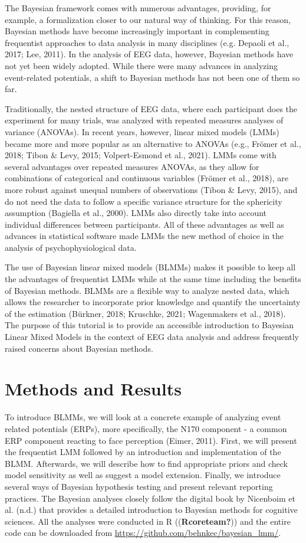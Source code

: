 \documentclass[
  doc,12pt,floatsintext]{apa7}
\begin{document}
The Bayesian framework comes with numerous advantages, providing, for example, a formalization closer to our natural way of thinking. For this reason, Bayesian methods have become increasingly important in complementing frequentist approaches to data analysis in many disciplines (e.g. Depaoli et al., 2017; Lee, 2011). In the analysis of EEG data, however, Bayesian methods have not yet been widely adopted. While there were many advances in analyzing event-related potentials, a shift to Bayesian methods has not been one of them so far.

Traditionally, the nested structure of EEG data, where each participant does the experiment for many trials, was analyzed with repeated measures analyses of variance (ANOVAs). In recent years, however, linear mixed models (LMMs) became more and more popular as an alternative to ANOVAs (e.g., Frömer et al., 2018; Tibon \& Levy, 2015; Volpert-Esmond et al., 2021). LMMs come with several advantages over repeated measures ANOVAs, as they allow for combinations of categorical and continuous variables (Frömer et al., 2018), are more robust against unequal numbers of observations (Tibon \& Levy, 2015), and do not need the data to follow a specific variance structure for the sphericity assumption (Bagiella et al., 2000). LMMs also directly take into account individual differences between participants. All of these advantages as well as advances in statistical software made LMMs the new method of choice in the analysis of psychophysiological data.

The use of Bayesian linear mixed models (BLMMs) makes it possible to keep all the advantages of frequentist LMMs while at the same time including the benefits of Bayesian methods. BLMMs are a flexible way to analyze nested data, which allows the researcher to incorporate prior knowledge and quantify the uncertainty of the estimation (Bürkner, 2018; Kruschke, 2021; Wagenmakers et al., 2018). The purpose of this tutorial is to provide an accessible introduction to Bayesian Linear Mixed Models in the context of EEG data analysis and address frequently raised concerns about Bayesian methods.

\section{Methods and Results}\label{methods-and-results}

To introduce BLMMs, we will look at a concrete example of analyzing event related potentials (ERPs), more specifically, the N170 component - a common ERP component reacting to face perception (Eimer, 2011). First, we will present the frequentist LMM followed by an introduction and implementation of the BLMM. Afterwards, we will describe how to find appropriate priors and check model sensitivity as well as suggest a model extension. Finally, we introduce several ways of Bayesian hypothesis testing and present relevant reporting practices. The Bayesian analyses closely follow the digital book by Nicenboim et al. (n.d.) that provides a detailed introduction to Bayesian methods for cognitive sciences. All the analyses were conducted in R ((\textbf{Rcoreteam?})) and the entire code can be downloaded from \url{https://github.com/behnkec/bayesian_lmm/}.
\end{document}
